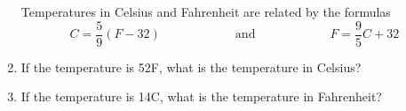 \documentclass[12pt]{article}
\begin{document}
\begin{enumerate}
Temperatures in Celsius and Fahrenheit are related by the formulas 
		\begin{equation*}
			C=\dfrac{5}{9}(F-32) \hspace{1in} \text{and} \hspace{1in} F=\dfrac{9}{5}C+32 
		\end{equation*}
\spacing

\item If the temperature is 52\degree F, what is the temperature in Celsius? 
\spacing

\item If the temperature is 14\degree C, what is the temperature in Fahrenheit? 
\spacing

\end{enumerate}
\end{document}

